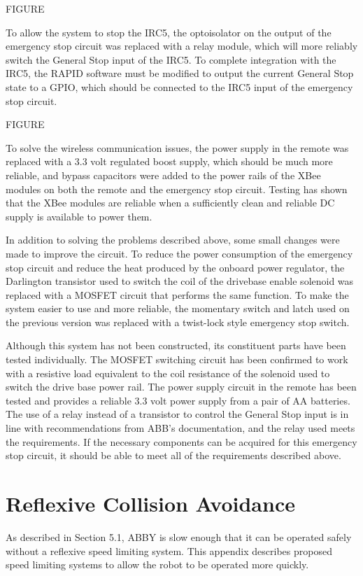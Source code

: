 \documentclass[]{cwru} %
\begin{document}
FIGURE

To allow the system to stop the IRC5, the optoisolator on the output of
the emergency stop circuit was replaced with a relay module, which will
more reliably switch the General Stop input of the IRC5. To complete
integration with the IRC5, the RAPID software must be modified to output
the current General Stop state to a GPIO, which should be connected to
the IRC5 input of the emergency stop circuit.

FIGURE

To solve the wireless communication issues, the power supply in the
remote was replaced with a 3.3 volt regulated boost supply, which should
be much more reliable, and bypass capacitors were added to the power
rails of the XBee modules on both the remote and the emergency stop
circuit. Testing has shown that the XBee modules are reliable when a
sufficiently clean and reliable DC supply is available to power them.

In addition to solving the problems described above, some small changes
were made to improve the circuit. To reduce the power consumption of the
emergency stop circuit and reduce the heat produced by the onboard power
regulator, the Darlington transistor used to switch the coil of the
drivebase enable solenoid was replaced with a MOSFET circuit that
performs the same function. To make the system easier to use and more
reliable, the momentary switch and latch used on the previous version
was replaced with a twist-lock style emergency stop switch.

Although this system has not been constructed, its constituent parts
have been tested individually. The MOSFET switching circuit has been
confirmed to work with a resistive load equivalent to the coil
resistance of the solenoid used to switch the drive base power rail. The
power supply circuit in the remote has been tested and provides a
reliable 3.3 volt power supply from a pair of AA batteries. The use of a
relay instead of a transistor to control the General Stop input is in
line with recommendations from ABB's documentation, and the relay used
meets the requirements. If the necessary components can be acquired for
this emergency stop circuit, it should be able to meet all of the
requirements described above.

\chapter{Reflexive Collision Avoidance}

As described in Section 5.1, ABBY is slow enough that it can be operated
safely without a reflexive speed limiting system. This appendix
describes proposed speed limiting systems to allow the robot to be
operated more quickly.
\end{document}

